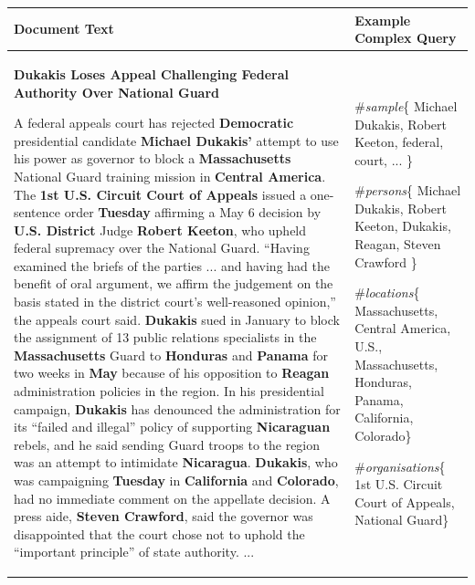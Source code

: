 \documentclass{mpaper}
\begin{document}
\begin{table}[t]
\centering
\begin{tabular}{|p{8cm} | p{5cm}|}
\hline
Document Text & Example Complex Query  \\ \hline
\textbf{Dukakis Loses Appeal Challenging Federal Authority Over National
Guard}

   A federal appeals court has rejected \textbf{Democratic} presidential candidate \textbf{Michael Dukakis'} attempt to use his power as governor to block a \textbf{Massachusetts} National Guard training mission in \textbf{Central America}.
   The \textbf{1st U.S. Circuit Court of Appeals} issued a one-sentence order \textbf{Tuesday} affirming a May 6 decision by \textbf{U.S. District} Judge \textbf{Robert Keeton}, who upheld federal supremacy over the National Guard.
   ``Having examined the briefs of the parties ... and having had the benefit of oral argument, we affirm the judgement on the basis stated in the district court's well-reasoned opinion,'' the appeals court said.
   \textbf{Dukakis} sued in January to block the assignment of 13 public relations specialists in the \textbf{Massachusetts} Guard to \textbf{Honduras} and \textbf{Panama} for two weeks in \textbf{May} because of his opposition to \textbf{Reagan} administration policies in the region.
   In his presidential campaign, \textbf{Dukakis} has denounced the administration for its ``failed and illegal'' policy of supporting \textbf{Nicaraguan} rebels, and he said sending Guard troops to the region was an attempt to intimidate \textbf{Nicaragua}.
   \textbf{Dukakis}, who was campaigning \textbf{Tuesday} in \textbf{California} and \textbf{Colorado}, had no immediate comment on the appellate decision. A press aide, \textbf{Steven Crawford}, said the governor was disappointed that the court chose not to uphold the ``important principle'' of state authority. ...
&
\#\textit{sample}\{ Michael Dukakis, Robert Keeton, federal, court, ... \}

\phantom{blah}

\#\textit{persons}\{ Michael Dukakis, Robert Keeton, Dukakis, Reagan, Steven Crawford \}

\phantom{blah}

\#\textit{locations}\{ Massachusetts, Central America, U.S., Massachusetts, Honduras, Panama, California, Colorado\} 

\phantom{blah}

\#\textit{organisations}\{ 1st U.S. Circuit Court of Appeals, National Guard\}


\end{tabular}
\end{table}
\end{document}

